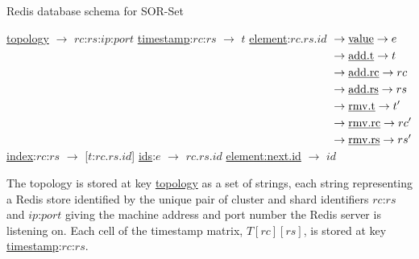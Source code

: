 \begin{algorithm}[t]
\setcounter{algorithm}{0}
\small{
	\caption{Redis database schema for SOR-Set}
 	\label{lst:redis_database_schema_for_sor-set}                       

 	\begin{algorithmic}[1]
 	  \State \underline{topology} $\rightarrow$ {$rc$:$rs$:$ip$:$port$} 
 	  \State \underline{timestamp}:$rc$:$rs$ $\rightarrow$ $t$ 
 	  \State \underline{element}:$rc.rs.id$ $\begin{aligned}[t]
                                              & \rightarrow \text{\underline{value}} \rightarrow e \\
                                              & \rightarrow \text{\underline{add.t}} \rightarrow t \\
                                              & \rightarrow \text{\underline{add.rc}} \rightarrow rc \\
                                              & \rightarrow \text{\underline{add.rs}} \rightarrow rs \\
                                              & \rightarrow \text{\underline{rmv.t}} \rightarrow t' \\
                                              & \rightarrow \text{\underline{rmv.rc}} \rightarrow rc' \\
                                              & \rightarrow \text{\underline{rmv.rs}} \rightarrow rs'
                                            \end{aligned}$ 
 	  \State \underline{index}:$rc$:$rs$ $\rightarrow$ [$t$:$rc.rs.id$] 
 	  \State \underline{ids}:$e$ $\rightarrow$ {$rc.rs.id$} 
 	  \State \underline{element:next.id} $\rightarrow$ $id$ 
	\end{algorithmic}
 }
\end{algorithm}

The topology is stored at key \underline{topology} as a set of strings, each
string representing a Redis store identified by the unique pair of cluster and
shard identifiers $rc$:$rs$ and $ip$:$port$ giving the machine address and port
number the Redis server is listening on. Each cell of the timestamp matrix,
$T[rc][rs]$, is stored at key \underline{timestamp}:$rc$:$rs$.

